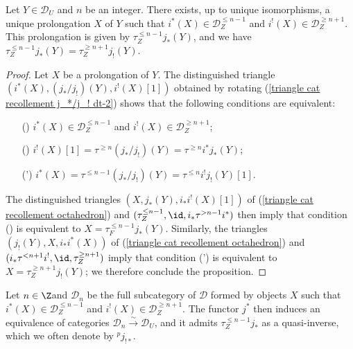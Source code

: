 \begin{proposition}\label{triangle cat recollement prolongation exist}
Let $Y\in\mathcal{D}_U$ and $n$ be an integer. There exists, up to unique isomorphisms, a unique prolongation $X$ of $Y$ such that $i^*(X)\in\mathcal{D}_Z^{\leq n-1}$ and $i^!(X)\in\mathcal{D}_Z^{\geq n+1}$. This prolongation is given by $\tau^{\leq n-1}_Zj_*(Y)$, and we have $\tau^{\leq n-1}_Zj_*(Y)=\tau^{\geq n+1}_Zj_!(Y)$.
\end{proposition}
\begin{proof}
Let $X$ be a prolongation of $Y$. The distinguished triangle $(i^*(X),(j_*/j_!)(Y),i^!(X)[1])$ obtained by rotating (\ref{triangle cat recollement j_*/j_! dt-2}) shows that the following conditions are equivalent:
\begin{enumerate}
    \item[(\rmnum{1})] $i^*(X)\in\mathcal{D}_Z^{\leq n-1}$ and $i^!(X)\in\mathcal{D}_Z^{\geq n+1}$;
    \item[(\rmnum{2})] $i^!(X)[1]=\tau^{\geq n}(j_*/j_!)(Y)=\tau^{\geq n}i^*j_*(Y)$;
    \item[(\rmnum{2}')] $i^*(X)=\tau^{\leq n-1}(j_*/j_!)(Y)=\tau^{\leq n}i^!j_!(Y)[1]$. 
\end{enumerate}
The distinguished triangles $(X,j_*(Y),i_*i^!(X)[1])$ of (\ref{triangle cat recollement octahedron}) and $(\tau^{\leq n-1}_Z,\id,i_*\tau^{>n-1}i^*)$ then imply that condition () is equivalent to $X=\tau^{\leq n-1}_Fj_*(Y)$. Similarly, the triangles $(j_!(Y),X,i_*i^*(X))$ of (\ref{triangle cat recollement octahedron}) and $(i_*\tau^{<n+1}i^!,\id,\tau_Z^{\geq n+1})$ imply that condition (') is equivalent to $X=\tau_Z^{\geq n+1}j_!(Y)$; we therefore conclude the proposition.
\end{proof}

\begin{remark}\label{triangle cat recollement prolongation equivalence by j^*}
Let $n\in\Z$and $\mathcal{D}_n$ be the full subcategory of $\mathcal{D}$ formed by objects $X$ such that $i^*(X)\in\mathcal{D}_Z^{\leq n-1}$ and $i^!(X)\in\mathcal{D}_Z^{\geq n+1}$. The functor $j^*$ then induces an equivalence of categories $\mathcal{D}_n\stackrel{\sim}{\to}\mathcal{D}_U$, and it admits $\tau^{\leq n-1}_Zj_*$ as a quasi-inverse, which we often denote by ${^p\!j_{!*}}$.
\end{remark}

